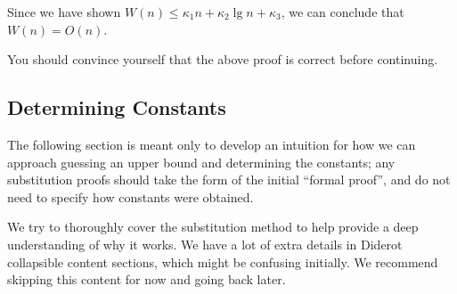 \begin{gram}
Since we have shown $W(n) \leq \kappa_1 n + \kappa_2 \lg n + \kappa_3$, we can
conclude that $W(n) = O(n)$.
\end{gram}

\begin{important}
You should convince yourself that the above proof is correct before continuing.
\end{important}

\subsection{Determining Constants}
\begin{note}
The following section is meant only to develop an intuition for how we can approach
guessing an upper bound and determining the constants; any substitution
proofs should take the form of the initial ``formal proof'', and do not need to
specify how constants were obtained.
\end{note}

\begin{note}
We try to thoroughly cover the substitution method to help
provide a deep understanding of why it works. We have a lot of extra details
in Diderot collapsible content sections, which might be confusing initially.
We recommend skipping this content for now and going back later.
\end{note}

